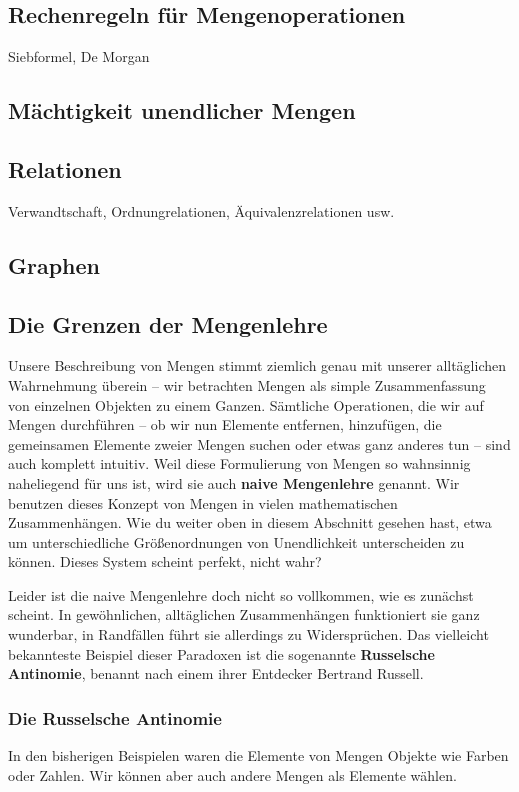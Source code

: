 \documentclass[../../main.tex]{subfiles}
\begin{document}
\subsection*{Rechenregeln für Mengenoperationen}
Siebformel, De Morgan

\subsection*{Mächtigkeit unendlicher Mengen}


\subsection*{Relationen}
\label{relationen}
Verwandtschaft, Ordnungrelationen, Äquivalenzrelationen usw.

\subsection*{Graphen}


\subsection*{Die Grenzen der Mengenlehre}
Unsere Beschreibung von Mengen stimmt ziemlich genau mit unserer alltäglichen Wahrnehmung überein -- wir betrachten Mengen als simple Zusammenfassung von einzelnen Objekten zu einem Ganzen. Sämtliche Operationen, die wir auf Mengen durchführen -- ob wir nun Elemente entfernen, hinzufügen, die gemeinsamen Elemente zweier Mengen suchen oder etwas ganz anderes tun -- sind auch komplett intuitiv. Weil diese Formulierung von Mengen so wahnsinnig naheliegend für uns ist, wird sie auch \textbf{naive Mengenlehre} genannt. Wir benutzen dieses Konzept von Mengen in vielen mathematischen Zusammenhängen. Wie du weiter oben in diesem Abschnitt gesehen hast, etwa um unterschiedliche Größenordnungen von Unendlichkeit unterscheiden zu können. Dieses System scheint perfekt, nicht wahr?

Leider ist die naive Mengenlehre doch nicht so vollkommen, wie es zunächst scheint. In gewöhnlichen, alltäglichen Zusammenhängen funktioniert sie ganz wunderbar, in Randfällen führt sie allerdings zu Widersprüchen. Das vielleicht bekannteste Beispiel dieser Paradoxen ist die sogenannte \textbf{Russelsche Antinomie}, benannt nach einem ihrer Entdecker Bertrand Russell. 

\subsubsection{Die Russelsche Antinomie}
In den bisherigen Beispielen waren die Elemente von Mengen Objekte wie Farben oder Zahlen. Wir können aber auch andere Mengen als Elemente wählen. 
\end{document}
